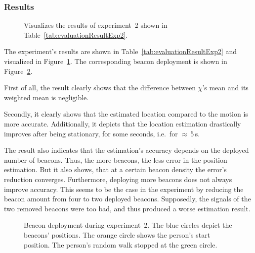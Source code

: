 \subsubsection*{Results}
\begin{table}
	
	\caption{Results of experiment~2.}
	\label{tab:evaluationResultExp2}
\end{table}

\begin{figure}
	
	\caption{Visualizes the results of experiment~2 shown in Table~\ref{tab:evaluationResultExp2}.}
	\label{fig:exp2_visualization}
\end{figure}

The experiment's results are shown in Table~\ref{tab:evaluationResultExp2} and visualized in Figure~\ref{fig:exp2_visualization}. The corresponding beacon deployment is shown in Figure~\ref{fig:exp2_imgs}.

First of all, the result clearly shows that the difference between $\chi$'s mean and its weighted mean is negligible.

Secondly, it clearly shows that the estimated location compared to the motion is more accurate. Additionally, it depicts that the location estimation drastically improves after being stationary, for some seconds, i.e.\ for $\approx$\,5\,s.

The result also indicates that the estimation's accuracy depends on the deployed number of beacons. Thus, the more beacons, the less error in the position estimation. But it also shows, that at a certain beacon density the error's reduction converges. Furthermore, deploying more beacons does not always improve accuracy. This seems to be the case in the experiment by reducing the beacon amount from four to two deployed beacons. Supposedly, the signals of the two removed beacons were too bad, and thus produced a worse estimation result.

\begin{figure}
	
	\caption{Beacon deployment during experiment~2. The blue circles depict the beacons' positions. The orange circle shows the person's start position. The person's random walk stopped at the green circle.}
	\label{fig:exp2_imgs}
\end{figure}


